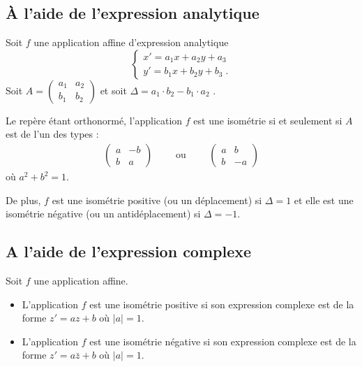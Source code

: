       \subsection{\`A l'aide de l'expression analytique}
            Soit $f$ une application affine d'expression analytique 
            \[
                  \left\lbrace
                        \begin{array}{l}
                              x' = a_1 x + a_2 y + a_3 \\
                              y' = b_1 x + b_2 y + b_3 \;.
                        \end{array}
                  \right.
            \]
            Soit 
            $ A = \begin{pmatrix} a_1 & a_2 \\ b_1 & b_2 \end{pmatrix} $
            et soit $\Delta = a_1 \cdot b_2 - b_1 \cdot a_2$
            .
            \begin{prop}
                  Le rep\`ere \'etant orthonorm\'e, l'application $f$ est une isom\'etrie si et seulement si $A$ est de l'un des types : 
                  \begin{align*}
                        \begin{pmatrix}
                              a & -b \\ b & a 
                        \end{pmatrix}
                              \qquad \text{ ou } \qquad
                        \begin{pmatrix}
                              a & b \\ b & -a
                        \end{pmatrix}
                  \end{align*}
                  o\`u $a^2 + b^2 = 1$.
                  
                  De plus, $f$ est une isom\'etrie positive (ou un d\'eplacement) si $\Delta = 1$
                  et elle est une isom\'etrie n\'egative (ou un antid\'eplacement) si $\Delta = -1$.
            \end{prop}
      \subsection{A l'aide de l'expression complexe}
            Soit $f$ une application affine.
            \begin{itemize}
                  \item L'application $f$ est une isom\'etrie positive si son expression complexe est de la forme
                        $z' = a z + b$ o\`u $|a| = 1$.
                  \item L'application $f$ est une isom\'etrie n\'egative si son expression complexe est de la forme
                        $z' = a \bar{z} + b$ o\`u $|a| = 1$.
            \end{itemize}
      
